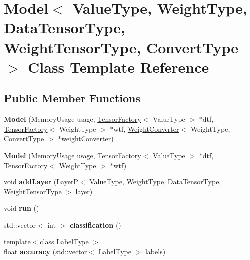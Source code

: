 \hypertarget{classModel}{}\section{Model$<$ Value\+Type, Weight\+Type, Data\+Tensor\+Type, Weight\+Tensor\+Type, Convert\+Type $>$ Class Template Reference}
\label{classModel}
\subsection*{Public Member Functions}
\begin{DoxyCompactItemize}
\item 
\mbox{\label{classModel_a636e9b3233a0e47d23d158b610ad2f0e}} 
{\bfseries Model} (Memory\+Usage usage, \hyperlink{classTensorFactory}{Tensor\+Factory}$<$ Value\+Type $>$ $\ast$dtf, \hyperlink{classTensorFactory}{Tensor\+Factory}$<$ Weight\+Type $>$ $\ast$wtf, \hyperlink{classWeightConverter}{Weight\+Converter}$<$ Weight\+Type, Convert\+Type $>$ $\ast$weight\+Converter)
\item 
\mbox{\label{classModel_a693cb3292d07a6c02d6079242c398e5b}} 
{\bfseries Model} (Memory\+Usage usage, \hyperlink{classTensorFactory}{Tensor\+Factory}$<$ Value\+Type $>$ $\ast$dtf, \hyperlink{classTensorFactory}{Tensor\+Factory}$<$ Weight\+Type $>$ $\ast$wtf)
\item 
\mbox{\label{classModel_a17ae9992a402276c43af41b7da670d57}} 
void {\bfseries add\+Layer} (LayerP$<$ Value\+Type, Weight\+Type, Data\+Tensor\+Type, Weight\+Tensor\+Type $>$ layer)
\item 
\mbox{\label{classModel_ae6df81bb406e41fdaa6146f79c9dbc01}} 
void {\bfseries run} ()
\item 
\mbox{\label{classModel_ac2f53c166a86322149d5b3fe2789a33d}} 
std\+::vector$<$ int $>$ {\bfseries classification} ()
\item 
\mbox{\label{classModel_a7453264187b6ce9709dbb59eefc19dcf}} 
{\footnotesize template$<$class Label\+Type $>$ }\\float {\bfseries accuracy} (std\+::vector$<$ Label\+Type $>$ labels)

\end{DoxyCompactItemize}
